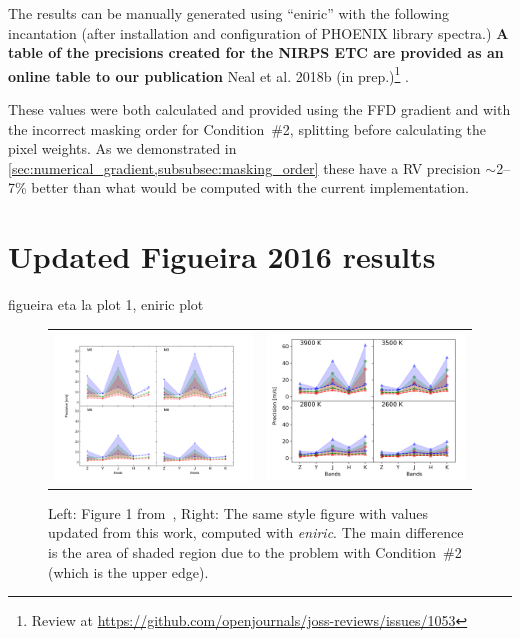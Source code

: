 The results can be manually generated using ``eniric'' with the following incantation (after installation and configuration of {PHOENIX} library spectra.)
\textbf{A table of the precisions created for the {NIRPS} ETC are provided as an online table to our publication} {Neal et al.
2018b (in prep.)}\footnote{Review at \href{https://github.com/openjournals/joss-reviews/issues/1053}{https://github.com/openjournals/joss-reviews/issues/1053}} .


These values were both calculated and provided using the {FFD} gradient and with the incorrect masking order for Condition~\#2, splitting before calculating the pixel weights.
As we demonstrated in \cref{sec:numerical_gradient,subsubsec:masking_order} these have a {RV} precision \(\sim\)2--7\% better than what would be computed with the current implementation.


\section{ Updated Figueira 2016 results}
 figueira eta la plot 1, eniric plot

\begin{figure}
    \centering
    \begin{tabular}{cc}
    \includegraphics[width=0.48\linewidth]{figures/information-content/Rvprec_vsini1.pdf} &  %
    \includegraphics[width=0.47\linewidth]{figures/information-content/precision_fourpanel.png}\\ %
    \end{tabular}
    \caption[Comparision of RV precision results to~\citet{figueira_radial_2016}.]{Left: Figure 1 from~\citet{figueira_radial_2016}, Right: The same style figure with values updated from this work, computed with \emph{eniric}.
The main difference is the area of shaded region due to the problem with Condition~\#2 (which is the upper edge).}
    \label{fig:my_label}
\end{figure}

